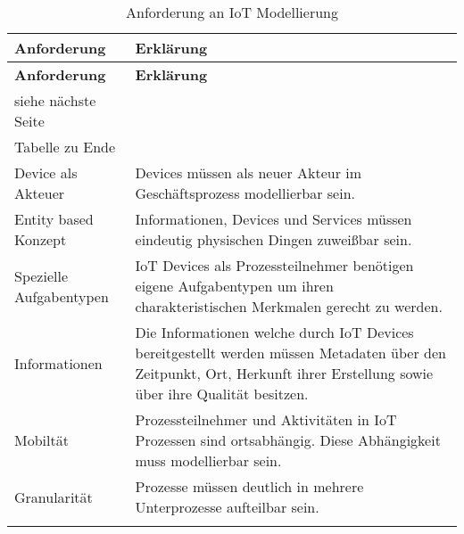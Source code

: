  \begin{longtable}{p{4.5cm}X}
  \caption{Anforderung an IoT Modellierung}\\
  \label{table:evaluierungskriterien}
  \textbf{Anforderung} & \textbf{Erklärung}   \\
  \hline
  \endfirsthead %
  \textbf{Anforderung} & \textbf{Erklärung}  \\
  \hline
  \endhead %
  siehe n{\"a}chste Seite\\
  \endfoot
  \hline
  Tabelle zu Ende \\
  \endlastfoot
Device als Akteuer & Devices müssen als neuer Akteur im Geschäftsprozess modellierbar sein.
\\ \hline
Entity based Konzept & Informationen, Devices und Services müssen eindeutig physischen Dingen zuweißbar sein.
\\ \hline
Spezielle Aufgabentypen & IoT Devices als Prozessteilnehmer benötigen eigene Aufgabentypen um ihren charakteristischen Merkmalen gerecht zu werden.
\\ \hline
Informationen  & Die Informationen welche durch IoT Devices bereitgestellt werden müssen Metadaten über den Zeitpunkt, Ort, Herkunft ihrer Erstellung sowie über ihre Qualität besitzen.
\\ \hline
Mobiltät & Prozessteilnehmer und Aktivitäten in IoT Prozessen sind ortsabhängig. Diese Abhängigkeit muss modellierbar sein.
\\ \hline
Granularität & Prozesse müssen deutlich in mehrere Unterprozesse aufteilbar sein.
\\ \hline
  \\ \hline
 \end{longtable}
